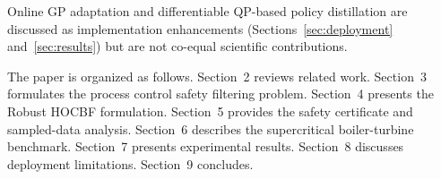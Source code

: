Online GP adaptation and differentiable QP-based policy distillation are discussed as implementation enhancements (Sections~\ref{sec:deployment} and~\ref{sec:results}) but are not co-equal scientific contributions.

The paper is organized as follows. Section~2 reviews related work. Section~3 formulates the process control safety filtering problem. Section~4 presents the Robust HOCBF formulation. Section~5 provides the safety certificate and sampled-data analysis. Section~6 describes the supercritical boiler-turbine benchmark. Section~7 presents experimental results. Section~8 discusses deployment limitations. Section~9 concludes.
